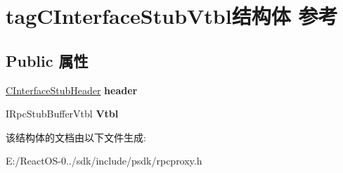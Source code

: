 \hypertarget{structtag_c_interface_stub_vtbl}{}\section{tag\+C\+Interface\+Stub\+Vtbl结构体 参考}
\label{structtag_c_interface_stub_vtbl}
\subsection*{Public 属性}
\begin{DoxyCompactItemize}
\item 
\mbox{\label{structtag_c_interface_stub_vtbl_a09136b238b85c0f03c0baab65824bad1}} 
\hyperlink{structtag_c_interface_stub_header}{C\+Interface\+Stub\+Header} {\bfseries header}
\item 
\mbox{\label{structtag_c_interface_stub_vtbl_a780f27002f9c11b41a6a4f1bf1130bcd}} 
I\+Rpc\+Stub\+Buffer\+Vtbl {\bfseries Vtbl}
\end{DoxyCompactItemize}


该结构体的文档由以下文件生成\+:\begin{DoxyCompactItemize}
\item 
E\+:/\+React\+O\+S-\/0../sdk/include/psdk/rpcproxy.\+h\end{DoxyCompactItemize}
